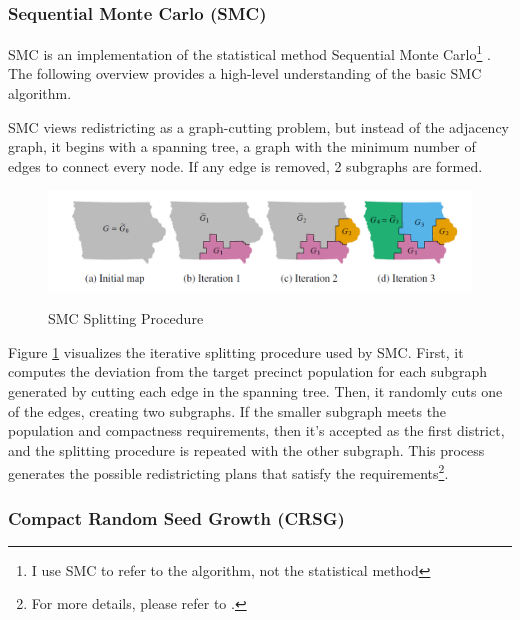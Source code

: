 \subsubsection{Sequential Monte Carlo (SMC)}
\label{sec:smc}

SMC is an implementation of the statistical method Sequential Monte Carlo\footnote{I use SMC to refer to the algorithm, not the statistical method} \parencite{mccartan2020}. The following overview provides a high-level understanding of the basic SMC algorithm.

SMC views redistricting as a graph-cutting problem, but instead of the adjacency graph, it begins with a spanning tree, a graph with the minimum number of edges to connect every node. If any edge is removed, 2 subgraphs are formed. 

\begin{figure}[hb]
    \caption{SMC Splitting Procedure}
    \includegraphics[width=\linewidth]{img/smc.PNG}
    \label{fig:smc}
    \raggedright
\end{figure}

Figure \ref{fig:smc} visualizes the iterative splitting procedure used by SMC. First, it computes the deviation from the target precinct population for each subgraph generated by cutting each edge in the spanning tree. Then, it randomly cuts one of the edges, creating two subgraphs. If the smaller subgraph meets the population and compactness requirements, then it's accepted as the first district, and the splitting procedure is repeated with the other subgraph. This process generates the possible redistricting plans that satisfy the requirements\footnote{For more details, please refer to \textcite{mccartan2020}.}.

\subsubsection{Compact Random Seed Growth (CRSG)}
\label{sec:crsg}

